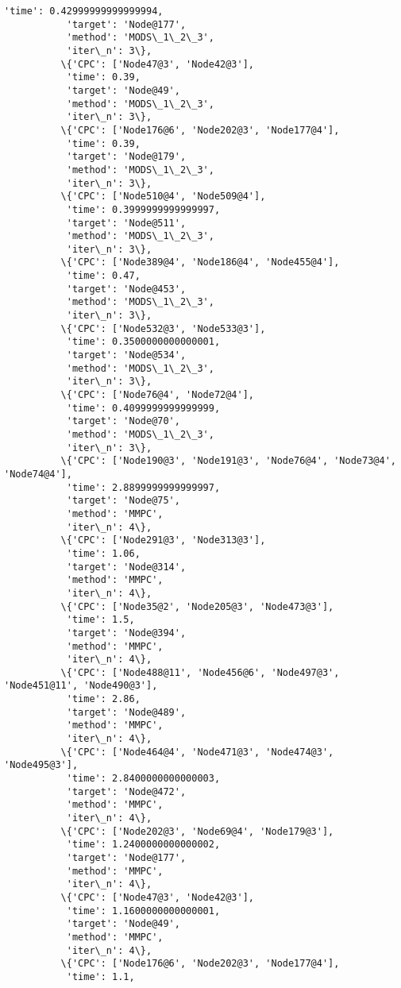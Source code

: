 \documentclass[11pt]{article}
\begin{document}
\begin{Verbatim}[commandchars=\\\{\}]
           'time': 0.42999999999999994,
           'target': 'Node@177',
           'method': 'MODS\_1\_2\_3',
           'iter\_n': 3\},
          \{'CPC': ['Node47@3', 'Node42@3'],
           'time': 0.39,
           'target': 'Node@49',
           'method': 'MODS\_1\_2\_3',
           'iter\_n': 3\},
          \{'CPC': ['Node176@6', 'Node202@3', 'Node177@4'],
           'time': 0.39,
           'target': 'Node@179',
           'method': 'MODS\_1\_2\_3',
           'iter\_n': 3\},
          \{'CPC': ['Node510@4', 'Node509@4'],
           'time': 0.3999999999999997,
           'target': 'Node@511',
           'method': 'MODS\_1\_2\_3',
           'iter\_n': 3\},
          \{'CPC': ['Node389@4', 'Node186@4', 'Node455@4'],
           'time': 0.47,
           'target': 'Node@453',
           'method': 'MODS\_1\_2\_3',
           'iter\_n': 3\},
          \{'CPC': ['Node532@3', 'Node533@3'],
           'time': 0.3500000000000001,
           'target': 'Node@534',
           'method': 'MODS\_1\_2\_3',
           'iter\_n': 3\},
          \{'CPC': ['Node76@4', 'Node72@4'],
           'time': 0.4099999999999999,
           'target': 'Node@70',
           'method': 'MODS\_1\_2\_3',
           'iter\_n': 3\},
          \{'CPC': ['Node190@3', 'Node191@3', 'Node76@4', 'Node73@4', 'Node74@4'],
           'time': 2.8899999999999997,
           'target': 'Node@75',
           'method': 'MMPC',
           'iter\_n': 4\},
          \{'CPC': ['Node291@3', 'Node313@3'],
           'time': 1.06,
           'target': 'Node@314',
           'method': 'MMPC',
           'iter\_n': 4\},
          \{'CPC': ['Node35@2', 'Node205@3', 'Node473@3'],
           'time': 1.5,
           'target': 'Node@394',
           'method': 'MMPC',
           'iter\_n': 4\},
          \{'CPC': ['Node488@11', 'Node456@6', 'Node497@3', 'Node451@11', 'Node490@3'],
           'time': 2.86,
           'target': 'Node@489',
           'method': 'MMPC',
           'iter\_n': 4\},
          \{'CPC': ['Node464@4', 'Node471@3', 'Node474@3', 'Node495@3'],
           'time': 2.8400000000000003,
           'target': 'Node@472',
           'method': 'MMPC',
           'iter\_n': 4\},
          \{'CPC': ['Node202@3', 'Node69@4', 'Node179@3'],
           'time': 1.2400000000000002,
           'target': 'Node@177',
           'method': 'MMPC',
           'iter\_n': 4\},
          \{'CPC': ['Node47@3', 'Node42@3'],
           'time': 1.1600000000000001,
           'target': 'Node@49',
           'method': 'MMPC',
           'iter\_n': 4\},
          \{'CPC': ['Node176@6', 'Node202@3', 'Node177@4'],
           'time': 1.1,

\end{Verbatim}
\end{document}
